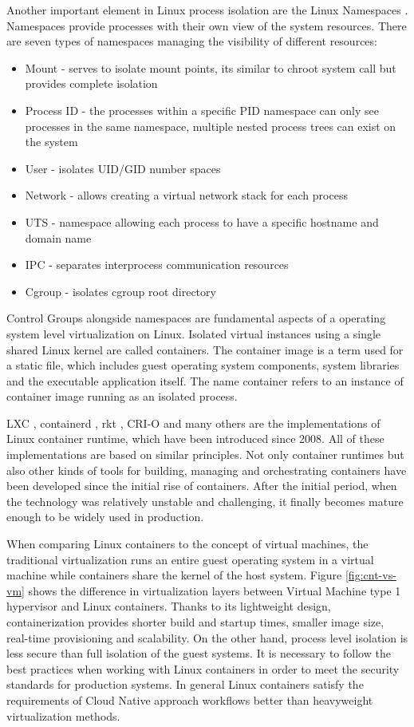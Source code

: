 \documentclass[
  digital, %
  twoside, %
  table,   %
  nolof,   %
  nolot,   %
]{fithesis3}
\begin{document}
Another important element in Linux process isolation are the Linux Namespaces \cite{linux_namespaces}. Namespaces provide processes with their own view of the system resources. There are seven types of namespaces managing the visibility of different resources:
\begin{itemize}
  \item Mount - serves to isolate mount points, its similar to chroot system call but provides complete isolation
  \item Process ID - the processes within a specific PID namespace can only see processes in the same namespace, multiple nested process trees can exist on the system
  \item User - isolates UID/GID number spaces
  \item Network - allows creating a virtual network stack for each process
  \item UTS - namespace allowing each process to have a specific hostname and domain name
  \item IPC - separates interprocess communication resources
  \item Cgroup - isolates cgroup root directory
\end{itemize}


Control Groups alongside namespaces are fundamental aspects of a operating system level virtualization on Linux. Isolated virtual instances using a single shared Linux kernel are called containers. The container image is a term used for a static file, which includes guest operating system components, system libraries and the executable application itself. The name container refers to an instance of container image running as an isolated process.

LXC \cite{lxc}, containerd \cite{containerd}, rkt \cite{rkt}, CRI-O \cite{cri-o} and many others are the implementations of Linux container runtime, which have been introduced since 2008. All of these implementations are based on similar principles. Not only container runtimes but also other kinds of tools for building, managing and orchestrating containers have been developed since the initial rise of containers. After the initial period, when the technology was relatively unstable and challenging, it finally becomes mature enough to be widely used in production.

When comparing Linux containers to the concept of virtual machines, the traditional virtualization runs an entire guest operating system in a virtual machine while containers share the kernel of the host system. Figure \ref{fig:cnt-vs-vm} shows the difference in virtualization layers between Virtual Machine type 1 hypervisor \cite{hypervisors} and Linux containers. Thanks to its lightweight design, containerization provides shorter build and startup times, smaller image size, real-time provisioning and scalability. On the other hand, process level isolation is less secure than full isolation of the guest systems. It is necessary to follow the best practices when working with Linux containers in order to meet the security standards for production systems. In general Linux containers satisfy the requirements of Cloud Native approach workflows better than heavyweight virtualization methods.
\end{document}
